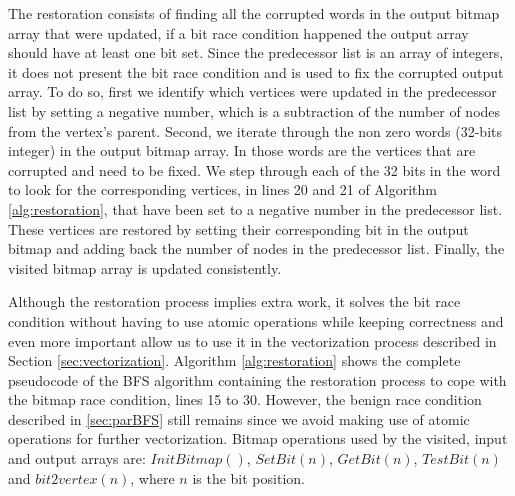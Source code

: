 \documentclass{sig-alternate-05-2015}
\begin{document}
The restoration consists of finding all the corrupted words in the output bitmap array that were updated, if a bit race condition happened the output array should have at least one bit set. Since the predecessor list is an array of integers, it does not present the bit race condition and is used to fix the corrupted output array. To do so, first we identify which vertices were updated in the predecessor list by setting a negative number, which is a subtraction of the number of nodes from the vertex's parent. Second, we iterate through the non zero words (32-bits integer) in the output bitmap array. In those words are the vertices that are corrupted and need to be fixed. We step through each of the 32 bits in the word to look for the corresponding vertices, in lines 20 and 21 of Algorithm \ref{alg:restoration}, that have been set to a negative number in the predecessor list. These vertices are restored by setting their corresponding bit in the output bitmap and adding back the number of nodes in the predecessor list. Finally, the visited bitmap array is updated consistently. 



Although the restoration process implies extra work, it solves the bit race condition without having to use atomic operations while keeping correctness and even more important allow us to use it in the vectorization process described in Section \ref{sec:vectorization}. Algorithm \ref{alg:restoration} shows the complete pseudocode of the BFS algorithm containing the restoration process to cope with the bitmap race condition, lines 15 to 30. However, the benign race condition described in \ref{sec:parBFS} still remains since we avoid making use of atomic operations for further vectorization. Bitmap operations used by the visited, input and output arrays are: $InitBitmap()$, $SetBit(n)$, $GetBit(n)$, $TestBit(n)$ and $bit2vertex(n)$, where $n$ is the bit position.
\end{document}
